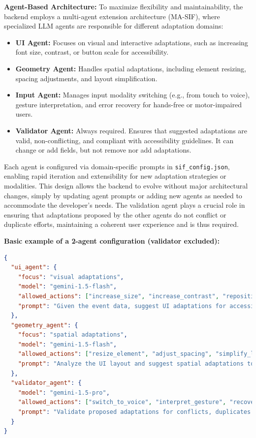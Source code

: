 \documentclass[openany]{book}
\begin{document}
\textbf{Agent-Based Architecture:}
To maximize flexibility and maintainability, the backend employs a multi-agent extension architecture (MA-SIF), where specialized LLM agents are responsible for different adaptation domains: \begin{itemize} \item \textbf{UI Agent:} Focuses on visual and interactive adaptations, such as increasing font size, contrast, or button scale for accessibility. \item \textbf{Geometry Agent:} Handles spatial adaptations, including element resizing, spacing adjustments, and layout simplification. \item \textbf{Input Agent:} Manages input modality switching (e.g., from touch to voice), gesture interpretation, and error recovery for hands-free or motor-impaired users. \item \textbf{Validator Agent:} Always required. Ensures that suggested adaptations are valid, non-conflicting, and compliant with accessibility guidelines. It can change or add fields, but not remove nor add adaptations.
 \end{itemize} Each agent is configured via domain-specific prompts in \texttt{sif\_config.json}, enabling rapid iteration and extensibility for new adaptation strategies or modalities. This design allows the backend to evolve without major architectural changes, simply by updating agent prompts or adding new agents as needed to accommodate the developer's needs. The validation agent plays a crucial role in ensuring that adaptations proposed by the other agents do not conflict or duplicate efforts, maintaining a coherent user experience and is thus required.

\textbf{Basic example of a 2-agent configuration (validator excluded):}
\begin{lstlisting}[language=json,firstnumber=1]
{
  "ui_agent": {
    "focus": "visual adaptations",
    "model": "gemini-1.5-flash",
    "allowed_actions": ["increase_size", "increase_contrast", "reposition_element"],
    "prompt": "Given the event data, suggest UI adaptations for accessibility. Consider user profile and interaction history."
  },
  "geometry_agent": {
    "focus": "spatial adaptations",
    "model": "gemini-1.5-flash",
    "allowed_actions": ["resize_element", "adjust_spacing", "simplify_layout"],
    "prompt": "Analyze the UI layout and suggest spatial adaptations to improve usability for motor-impaired users."
  },
  "validator_agent": {
    "model": "gemini-1.5-pro",
    "allowed_actions": ["switch_to_voice", "interpret_gesture", "recover_from_error", "increase_size", "increase_contrast", "reposition_element","resize_element", "adjust_spacing", "simplify_layout"],
    "prompt": "Validate proposed adaptations for conflicts, duplicates and inconsistencies based on user context, events and interaction history."
  }
}
\end{lstlisting}
\end{document}
